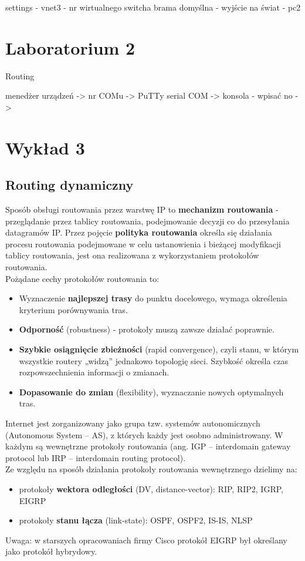 \documentclass[a4paper]{article}
\begin{document}
settings - vnet3 - nr wirtualnego switcha
brama domyślna - wyjście na świat - pc2

\section{Laboratorium 2}
Routing

menedżer urządzeń -> nr COMu -> PuTTy serial COM -> konsola - wpisać no ->

\section{Wykład 3}

\subsection{Routing dynamiczny}
Sposób obsługi routowania przez warstwę IP to \textbf{mechanizm routowania} -
przeglądanie przez tablicy routowania, podejmowanie decyzji co do przesyłania datagramów IP.
Przez pojęcie \textbf{polityka routowania} określa się działania procesu routowania podejmowane w
celu ustanowienia i bieżącej modyfikacji tablicy routowania, jest ona realizowana z wykorzystaniem protokołów routowania.\\

Pożądane cechy protokołów routowania to:
\begin{itemize}
    \item Wyznaczenie \textbf{najlepszej trasy} do punktu docelowego, wymaga określenia kryterium porównywania tras.
    \item \textbf{Odporność} (robustness) - protokoły muszą zawsze działać poprawnie.
    \item \textbf{Szybkie osiągnięcie zbieżności} (rapid convergence), czyli stanu, w którym wszystkie routery „widzą” jednakowo topologię sieci.
Szybkość określa czas rozpowszechnienia informacji o zmianach.
    \item \textbf{Dopasowanie do zmian} (flexibility), wyznaczanie nowych optymalnych tras.
\end{itemize}

Internet jest zorganizowany jako grupa tzw. systemów autonomicznych (Autonomous
System – AS), z których każdy jest osobno administrowany. W każdym są wewnętrzne protokoły routowania (ang. IGP – interdomain gateway protocol lub IRP – interdomain routing protocol).\\

Ze względu na sposób działania protokoły routowania wewnętrznego dzielimy na:
\begin{itemize}
    \item protokoły \textbf{wektora odległości} (DV, distance-vector): RIP, RIP2, IGRP, EIGRP
    \item protokoły \textbf{stanu łącza} (link-state): OSPF, OSPF2, IS-IS, NLSP
\end{itemize}
Uwaga: w starszych opracowaniach firmy Cisco protokół EIGRP był określany jako protokół
hybrydowy.
\end{document}
